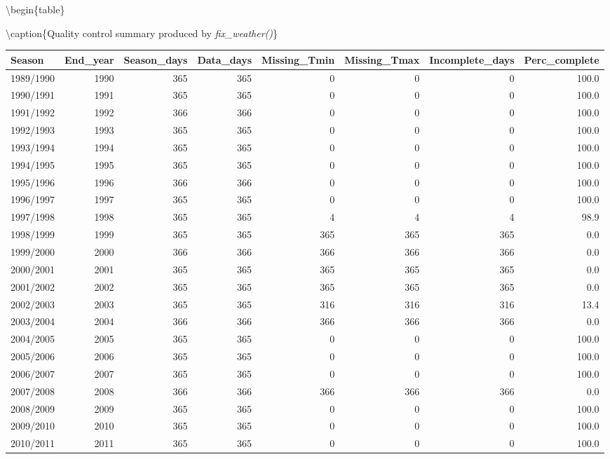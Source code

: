 \documentclass[
]{book}
\begin{document}
\textbackslash begin\{table\}

\textbackslash caption\{\label{tab:unnamed-chunk-9}Quality control summary produced by \emph{fix\_weather()}\}
\fontsize{10}{12}\selectfont

\begin{tabular}[t]{l|r|r|r|r|r|r|r}
\hline
Season & End\_year & Season\_days & Data\_days & Missing\_Tmin & Missing\_Tmax & Incomplete\_days & Perc\_complete\\
\hline
1989/1990 & 1990 & 365 & 365 & 0 & 0 & 0 & 100.0\\
\hline
1990/1991 & 1991 & 365 & 365 & 0 & 0 & 0 & 100.0\\
\hline
1991/1992 & 1992 & 366 & 366 & 0 & 0 & 0 & 100.0\\
\hline
1992/1993 & 1993 & 365 & 365 & 0 & 0 & 0 & 100.0\\
\hline
1993/1994 & 1994 & 365 & 365 & 0 & 0 & 0 & 100.0\\
\hline
1994/1995 & 1995 & 365 & 365 & 0 & 0 & 0 & 100.0\\
\hline
1995/1996 & 1996 & 366 & 366 & 0 & 0 & 0 & 100.0\\
\hline
1996/1997 & 1997 & 365 & 365 & 0 & 0 & 0 & 100.0\\
\hline
1997/1998 & 1998 & 365 & 365 & 4 & 4 & 4 & 98.9\\
\hline
1998/1999 & 1999 & 365 & 365 & 365 & 365 & 365 & 0.0\\
\hline
1999/2000 & 2000 & 366 & 366 & 366 & 366 & 366 & 0.0\\
\hline
2000/2001 & 2001 & 365 & 365 & 365 & 365 & 365 & 0.0\\
\hline
2001/2002 & 2002 & 365 & 365 & 365 & 365 & 365 & 0.0\\
\hline
2002/2003 & 2003 & 365 & 365 & 316 & 316 & 316 & 13.4\\
\hline
2003/2004 & 2004 & 366 & 366 & 366 & 366 & 366 & 0.0\\
\hline
2004/2005 & 2005 & 365 & 365 & 0 & 0 & 0 & 100.0\\
\hline
2005/2006 & 2006 & 365 & 365 & 0 & 0 & 0 & 100.0\\
\hline
2006/2007 & 2007 & 365 & 365 & 0 & 0 & 0 & 100.0\\
\hline
2007/2008 & 2008 & 366 & 366 & 366 & 366 & 366 & 0.0\\
\hline
2008/2009 & 2009 & 365 & 365 & 0 & 0 & 0 & 100.0\\
\hline
2009/2010 & 2010 & 365 & 365 & 0 & 0 & 0 & 100.0\\
\hline
2010/2011 & 2011 & 365 & 365 & 0 & 0 & 0 & 100.0\\

\end{tabular}
\end{document}
